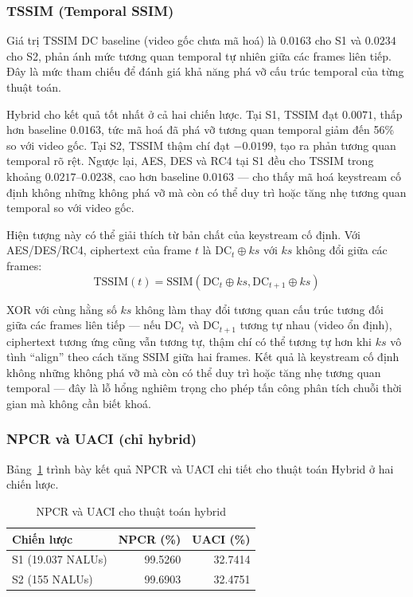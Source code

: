 \subsubsection{TSSIM (Temporal SSIM)}

Giá trị TSSIM DC baseline (video gốc chưa mã hoá) là $0.0163$ cho S1 và $0.0234$ cho S2, phản ánh mức tương quan temporal tự nhiên giữa các frames liên tiếp. Đây là mức tham chiếu để đánh giá khả năng phá vỡ cấu trúc temporal của từng thuật toán.

Hybrid cho kết quả tốt nhất ở cả hai chiến lược. Tại S1, TSSIM đạt $0.0071$, thấp hơn baseline $0.0163$, tức mã hoá đã phá vỡ tương quan temporal giảm đến 56\% so với video gốc. Tại S2, TSSIM thậm chí đạt $-0.0199$, tạo ra phản tương quan temporal rõ rệt. Ngược lại, AES, DES và RC4 tại S1 đều cho TSSIM trong khoảng $0.0217$--$0.0238$, cao hơn baseline $0.0163$ --- cho thấy mã hoá keystream cố định không những không phá vỡ mà còn có thể duy trì hoặc tăng nhẹ tương quan temporal so với video gốc.

Hiện tượng này có thể giải thích từ bản chất của keystream cố định. Với AES/DES/RC4, ciphertext của frame $t$ là $\text{DC}_t \oplus ks$ với $ks$ không đổi giữa các frames:
\begin{equation}
\text{TSSIM}(t) = \text{SSIM}(\text{DC}_t \oplus ks, \text{DC}_{t+1} \oplus ks)
\end{equation}

XOR với cùng hằng số $ks$ không làm thay đổi tương quan cấu trúc tương đối giữa các frames liên tiếp --- nếu $\text{DC}_t$ và $\text{DC}_{t+1}$ tương tự nhau (video ổn định), ciphertext tương ứng cũng vẫn tương tự, thậm chí có thể tương tự hơn khi $ks$ vô tình ``align'' theo cách tăng SSIM giữa hai frames. Kết quả là keystream cố định không những không phá vỡ mà còn có thể duy trì hoặc tăng nhẹ tương quan temporal --- đây là lỗ hổng nghiêm trọng cho phép tấn công phân tích chuỗi thời gian mà không cần biết khoá.

\subsubsection{NPCR và UACI (chỉ hybrid)}

Bảng~\ref{tab:npcr_detail} trình bày kết quả NPCR và UACI chi tiết cho thuật toán Hybrid ở hai chiến lược.

\begin{table}[ht]
\centering
\caption{NPCR và UACI cho thuật toán hybrid}
\label{tab:npcr_detail}
\begin{tabular}{|l|r|r|}
\hline
\textbf{Chiến lược} & \textbf{NPCR (\%)} & \textbf{UACI (\%)} \\
\hline
S1 (19.037 NALUs) & 99.5260 & 32.7414 \\
\hline
S2 (155 NALUs)    & 99.6903 & 32.4751 \\
\hline
\end{tabular}
\end{table}


